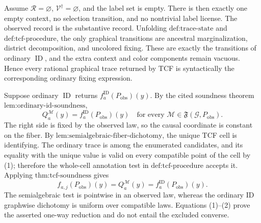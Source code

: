 Assume \(\mathcal R=\varnothing\), \(\mathcal V^{\dagger}=\varnothing\), and the label set is empty.  There is then exactly one empty context, no selection transition, and no nontrivial label license.  The observed record is the substantive record.  Unfolding \(\text{def:trace-state}\) and \(\text{def:tcf-procedure}\), the only graphical transitions are ancestral marginalization, district decomposition, and uncolored fixing.  These are exactly the transitions of ordinary \(\operatorname{ID}\), and the extra context and color components remain vacuous.  Hence every rational graphical trace returned by TCF is syntactically the corresponding ordinary fixing expression.

Suppose ordinary \(\operatorname{ID}\) returns \(f_a^{\mathrm{ID}}(P_{\mathrm{obs}})(y)\).  By the cited soundness theorem \(\text{lem:ordinary-id-soundness}\),
\[
Q_a^{\mathcal M}(y)=f_a^{\mathrm{ID}}(P_{\mathrm{obs}})(y)
\quad\text{for every }\mathcal M\in\mathfrak F(\mathcal G,P_{\mathrm{obs}}).
\tag{1}
\]
The right side is fixed by the observed law, so the causal coordinate is constant on the fiber.  By \(\text{lem:semialgebraic-fiber-dichotomy}\), the unique TCF cell is identifying.  The ordinary trace is among the enumerated candidates, and its equality with the unique value is valid on every compatible point of the cell by (1); therefore the whole-cell annotation test in \(\text{def:tcf-procedure}\) accepts it.  Applying \(\text{thm:tcf-soundness}\) gives
\[
f_{a,j}(P_{\mathrm{obs}})(y)
=Q_a^{\mathcal M}(y)
=f_a^{\mathrm{ID}}(P_{\mathrm{obs}})(y).
\tag{2}
\]
The semialgebraic test is pointwise in an observed law, whereas the ordinary ID graphwise dichotomy is uniform over compatible laws.  Equations (1)--(2) prove the asserted one-way reduction and do not entail the excluded converse.